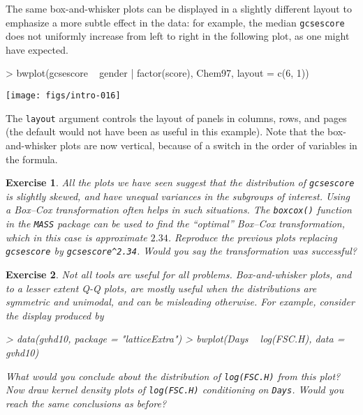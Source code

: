 \documentclass[10pt]{article}
\newcommand{\code}[1]{\texttt{#1}}
\newcommand{\Rfunction}[1]{\code{#1()}}
\newtheorem{exercise}{Exercise}
\begin{document}
\newpage


The same box-and-whisker plots can be displayed in a slightly
different layout to emphasize a more subtle effect in the data: for
example, the median \code{gcsescore} does not uniformly increase from
left to right in the following plot, as one might have expected.
\begin{Schunk}
\begin{Sinput}
> bwplot(gcsescore ~ gender | factor(score), Chem97, layout = c(6, 1))
\end{Sinput}
\end{Schunk}
\begin{center}
\texttt{[image: figs/intro-016]}
\end{center}
The \code{layout} argument controls the layout of panels in columns,
rows, and pages (the default would not have been as useful in this
example).  Note that the box-and-whisker plots are now vertical,
because of a switch in the order of variables in the formula.

\begin{exercise}
  All the plots we have seen suggest that the distribution of
  \code{gcsescore} is slightly skewed, and have unequal variances in
  the subgroups of interest.  Using a Box--Cox transformation often
  helps in such situations.  The \Rfunction{boxcox} function in the
  \code{MASS} package can be used to find the ``optimal'' Box--Cox
  transformation, which in this case is approximate $2.34$.  Reproduce
  the previous plots replacing \code{gcsescore} by
  \code{gcsescore\^{}2.34}.  Would you say the transformation was
  successful?
\end{exercise}

\begin{exercise}
  Not all tools are useful for all problems.  Box-and-whisker plots,
  and to a lesser extent Q-Q plots, are mostly useful when the
  distributions are symmetric and unimodal, and can be misleading
  otherwise.  For example, consider the display produced by
\begin{Schunk}
\begin{Sinput}
> data(gvhd10, package = "latticeExtra")
> bwplot(Days ~ log(FSC.H), data = gvhd10)
\end{Sinput}
\end{Schunk}
  What would you conclude about the distribution of \code{log(FSC.H)} 
  from this plot? Now draw kernel density plots of \code{log(FSC.H)}
  conditioning on \code{Days}.  Would you reach the same conclusions
  as before?
\end{exercise}
\end{document}

